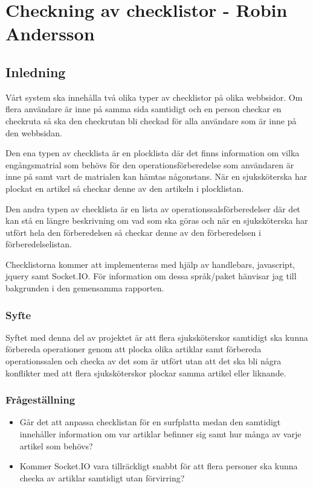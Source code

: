 \section{Checkning av checklistor - Robin Andersson}
\subsection{Inledning}
Vårt system ska innehålla två olika typer av checklistor på olika webbsidor. Om flera användare är inne på samma sida samtidigt och en person checkar en checkruta så ska den checkrutan bli checkad för alla användare som är inne på den webbsidan.

Den ena typen av checklista är en plocklista där det finns information om vilka engångsmatrial som behövs för den operationsförberedelse som användaren är inne på samt vart de matrialen kan hämtas någonstans. När en sjuksköterska har plockat en artikel så checkar denne av den artikeln i plocklistan.

Den andra typen av checklista är en lista av operationssalsförberedelser där det kan stå en längre beskrivning om vad som ska göras och när en sjuksköterska har utfört hela den förberedelsen så checkar denne av den förberedelsen i förberedelselistan.

Checklistorna kommer att implementeras med hjälp av handlebars, javascript, jquery samt Socket.IO. För information om dessa språk/paket hänvisar jag till bakgrunden i den gemensamma rapporten.

\subsubsection{Syfte}
Syftet med denna del av projektet är att flera sjuksköterskor samtidigt ska kunna förbereda operationer genom att plocka olika artiklar samt förbereda operationssalen och checka av det som är utfört utan att det ska bli några konflikter med att flera sjuksköterskor plockar samma artikel eller liknande.

\subsubsection{Frågeställning}
\begin{itemize}
\item Går det att anpassa checklistan för en surfplatta medan den samtidigt innehåller information om var artiklar befinner sig samt hur många av varje artikel som behövs?

\item Kommer Socket.IO vara tillräckligt snabbt för att flera personer ska kunna checka av artiklar samtidigt utan förvirring?
\end{itemize}

